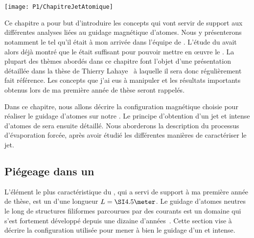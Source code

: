 \chapter{\TitreChapitreUn}%
\label{chap:JetAtomique}

\bfigh
\texttt{[image: P1/ChapitreJetAtomique]}
\SansCaption
\efigh

\pagebreak

\minitoc
\vspace{0.5cm}

Ce chapitre a pour but d'introduire les concepts qui vont servir de support aux différentes analyses liées au guidage magnétique d'atomes. Nous y présenterons notamment le \setup tel qu'il était à mon arrivée dans l'équipe de \dgo. L'étude du \jatgm avait alors déjà montré que le \tcolel était suffisant pour pouvoir mettre en \oe uvre le \rpef. 
La plupart des thèmes abordés dans ce chapitre font l'objet d'une présentation détaillée dans la thèse de Thierry Lahaye~\cite{TTL} à laquelle il sera donc régulièrement fait référence.
Les concepts que j'ai eus à manipuler et les résultats importants obtenus lors de ma première année de thèse seront rappelés.

Dans ce chapitre, nous allons décrire la configuration magnétique choisie pour réaliser le guidage d'atomes sur notre \setup. Le principe d'obtention d'un jet \uf et intense d'atomes de \Rb sera ensuite détaillé. Nous aborderons la description du processus d'évaporation forcée, après avoir étudié les différentes manières de caractériser le jet.

\section{Piégeage dans un \gm \qp}\label{sec:PiegeageMagnetiqueGuide}

L'élément le plus caractéristique du \setup, qui a servi de support à ma première année de thèse, est un \gm d'une longueur $\Lguide=\m{4.5}$. 
Le guidage d'atomes neutres le long de structures filiformes parcourues par des courants est un domaine qui s'est fortement développé depuis une dizaine d'années~\cite{Sch95,KHR00,DLL00,TeR01,SBC01}. 
Cette section vise à décrire la configuration utilisée pour mener à bien le guidage d'un \jatuf et intense.

\casse

